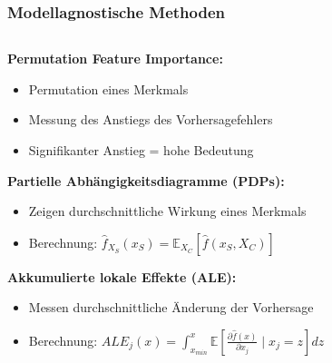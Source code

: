 \documentclass[aspectratio=1610, xcolor=dvipsnames, 9pt]{beamer}
\begin{document}
\begin{frame}
  \frametitle{Modellagnostische Methoden}
  \begin{columns}
    \begin{column}{1\textwidth}
      \textbf{Permutation Feature Importance:}
      \begin{itemize}
        \item Permutation eines Merkmals
        \item Messung des Anstiegs des Vorhersagefehlers
        \item Signifikanter Anstieg = hohe Bedeutung
      \end{itemize}
      \vspace{0.5cm}
      \textbf{Partielle Abhängigkeitsdiagramme (PDPs):}
      \begin{itemize}
        \item Zeigen durchschnittliche Wirkung eines Merkmals
        \item Berechnung: $\hat{f}_{X_S}(x_S) = \mathbb{E}_{X_C}[\hat{f}(x_S, X_C)]$
      \end{itemize}
      \vspace{0.5cm}
      \textbf{Akkumulierte lokale Effekte (ALE):}
      \begin{itemize}
        \item Messen durchschnittliche Änderung der Vorhersage
        \item Berechnung: $ALE_j(x) = \int_{x_{min}}^x \mathbb{E} \left[ \frac{\partial \hat{f}(x)}{\partial x_j} \mid x_j = z \right] dz$
      \end{itemize}
    \end{column}
  \end{columns}
\end{frame}
\end{document}

